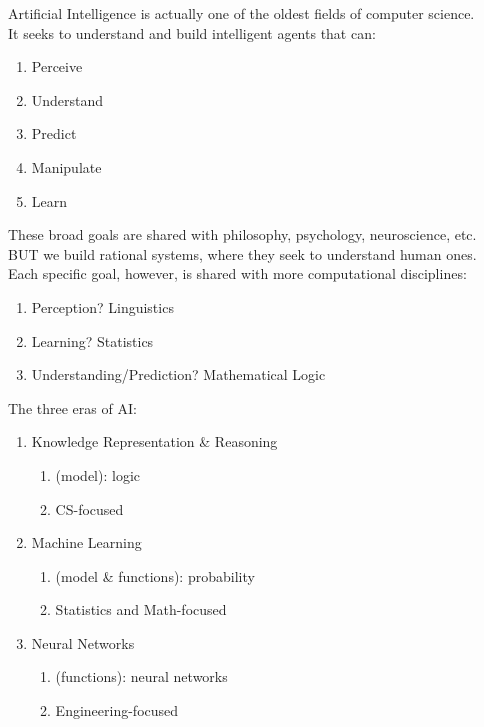 \documentclass[../../lecture_notes.tex]{subfiles}
\begin{document}
\noindent Artificial Intelligence is actually one of the oldest fields of computer science.\\
It seeks to understand and build intelligent agents that can: \begin{enumerate} [itemsep=0mm]
	\item Perceive
	\item Understand
	\item Predict
	\item Manipulate
	\item Learn
\end{enumerate}
\noindent These broad goals are shared with philosophy, psychology, neuroscience, etc.\\
\indent BUT we build rational systems, where they seek to understand human ones.\\
\noindent Each specific goal, however, is shared with more computational disciplines:
	\begin{enumerate} [itemsep=0mm]
		\item Perception? Linguistics
		\item Learning? Statistics
		\item Understanding/Prediction? Mathematical Logic
	\end{enumerate}

\noindent The three eras of AI:
\begin{enumerate} [itemsep=0mm]
	\item Knowledge Representation \& Reasoning
		\begin{enumerate} [itemsep=0mm]
        			\item (model): logic
        			\item CS-focused
		\end{enumerate}
	\item Machine Learning
		\begin{enumerate} [itemsep=0mm]
			\item (model \& functions): probability
			\item Statistics and Math-focused
		\end{enumerate}
	\item Neural Networks
		\begin{enumerate} [itemsep=0mm]
			\item (functions): neural networks
			\item Engineering-focused
		\end{enumerate}
\end{enumerate}
\end{document}
